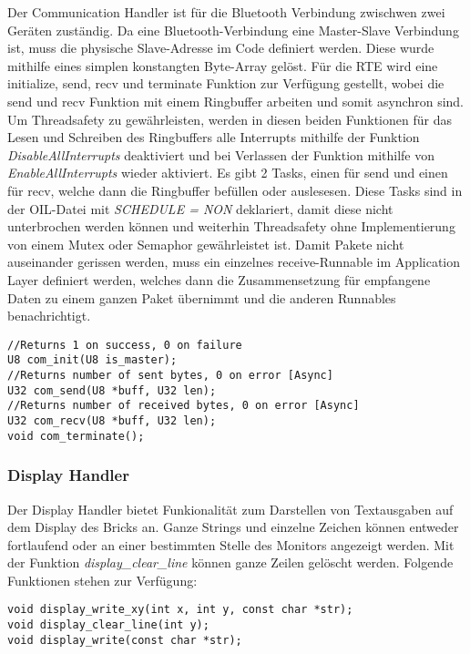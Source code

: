 Der Communication Handler ist für die Bluetooth Verbindung zwischwen zwei Geräten zuständig. Da eine Bluetooth-Verbindung eine Master-Slave Verbindung ist, muss die physische Slave-Adresse im Code definiert werden.
Diese wurde mithilfe eines simplen konstangten Byte-Array gelöst. Für die RTE wird eine initialize, send, recv und terminate Funktion zur Verfügung gestellt, wobei die send und recv Funktion mit einem Ringbuffer arbeiten und somit asynchron sind.
Um Threadsafety zu gewährleisten, werden in diesen beiden Funktionen für das Lesen und Schreiben des Ringbuffers alle Interrupts mithilfe der Funktion \textit{DisableAllInterrupts} deaktiviert und bei Verlassen der Funktion mithilfe von \textit{EnableAllInterrupts} wieder aktiviert.
Es gibt 2 Tasks, einen für send und einen für recv, welche dann die Ringbuffer befüllen oder auslesesen. Diese Tasks sind in der OIL-Datei mit \textit{SCHEDULE = NON} deklariert, damit diese nicht unterbrochen werden können und weiterhin Threadsafety ohne Implementierung von einem Mutex oder Semaphor gewährleistet ist.
Damit Pakete nicht auseinander gerissen werden, muss ein einzelnes receive-Runnable im Application Layer definiert werden, welches dann die Zusammensetzung für empfangene Daten zu einem ganzen Paket übernimmt und die anderen Runnables benachrichtigt.

\begin{lstlisting}[frame=single]  
//Returns 1 on success, 0 on failure
U8 com_init(U8 is_master);
//Returns number of sent bytes, 0 on error [Async]		
U32 com_send(U8 *buff, U32 len);
//Returns number of received bytes, 0 on error [Async]	
U32 com_recv(U8 *buff, U32 len);	
void com_terminate();
\end{lstlisting}


\subsubsection{Display Handler}
Der Display Handler bietet Funkionalität zum Darstellen von Textausgaben auf dem Display des Bricks an.
Ganze Strings und einzelne Zeichen können entweder fortlaufend oder an einer bestimmten Stelle des Monitors angezeigt werden.
Mit der Funktion \textit{display\_clear\_line} können ganze Zeilen gelöscht werden. Folgende Funktionen stehen zur Verfügung:

\begin{lstlisting}[frame=single]  
void display_write_xy(int x, int y, const char *str);
void display_clear_line(int y);
void display_write(const char *str);
\end{lstlisting}


